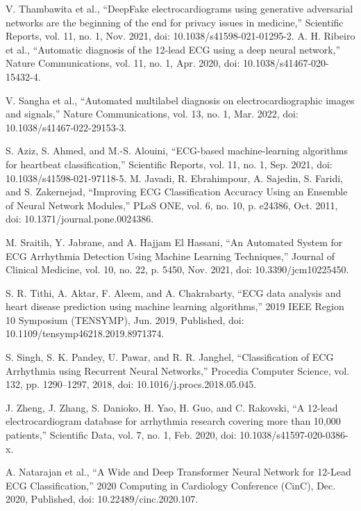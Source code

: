 \documentclass[conference]{IEEEtran}
\begin{document}
\begin{thebibliography}{00}
V. Thambawita et al., “DeepFake electrocardiograms using generative adversarial networks are the beginning of the end for privacy issues in medicine,” Scientific Reports, vol. 11, no. 1, Nov. 2021, doi: 10.1038/s41598-021-01295-2.
 A. H. Ribeiro et al., “Automatic diagnosis of the 12-lead ECG using a deep neural network,” Nature Communications, vol. 11, no. 1, Apr. 2020, doi: 10.1038/s41467-020-15432-4.

 V. Sangha et al., “Automated multilabel diagnosis on electrocardiographic images and signals,” Nature Communications, vol. 13, no. 1, Mar. 2022, doi: 10.1038/s41467-022-29153-3.

  S. Aziz, S. Ahmed, and M.-S. Alouini, “ECG-based machine-learning algorithms for heartbeat classification,” Scientific Reports, vol. 11, no. 1, Sep. 2021, doi: 10.1038/s41598-021-97118-5.
 M. Javadi, R. Ebrahimpour, A. Sajedin, S. Faridi, and S. Zakernejad, “Improving ECG Classification Accuracy Using an Ensemble of Neural Network Modules,” PLoS ONE, vol. 6, no. 10, p. e24386, Oct. 2011, doi: 10.1371/journal.pone.0024386.

 M. Sraitih, Y. Jabrane, and A. Hajjam El Hassani, “An Automated System for ECG Arrhythmia Detection Using Machine Learning Techniques,” Journal of Clinical Medicine, vol. 10, no. 22, p. 5450, Nov. 2021, doi: 10.3390/jcm10225450.

 S. R. Tithi, A. Aktar, F. Aleem, and A. Chakrabarty, “ECG data analysis and heart disease prediction using machine learning algorithms,” 2019 IEEE Region 10 Symposium (TENSYMP), Jun. 2019, Published, doi: 10.1109/tensymp46218.2019.8971374.

  S. Singh, S. K. Pandey, U. Pawar, and R. R. Janghel, “Classification of ECG Arrhythmia using Recurrent Neural Networks,” Procedia Computer Science, vol. 132, pp. 1290–1297, 2018, doi: 10.1016/j.procs.2018.05.045.

  J. Zheng, J. Zhang, S. Danioko, H. Yao, H. Guo, and C. Rakovski, “A 12-lead electrocardiogram database for arrhythmia research covering more than 10,000 patients,” Scientific Data, vol. 7, no. 1, Feb. 2020, doi: 10.1038/s41597-020-0386-x.

 A. Natarajan et al., “A Wide and Deep Transformer Neural Network for 12-Lead ECG Classification,” 2020 Computing in Cardiology Conference (CinC), Dec. 2020, Published, doi: 10.22489/cinc.2020.107.


\end{thebibliography}
\end{document}
